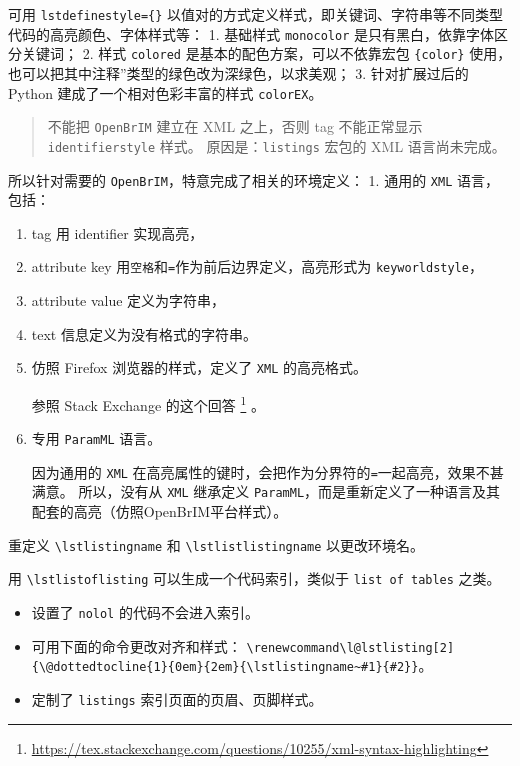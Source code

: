 \documentclass[../Main/thesis.tex]{subfiles}
\begin{document}
可用 \texttt{lstdefinestyle=\{\}}
以值对的方式定义样式，即关键词、字符串等不同类型代码的高亮颜色、字体样式等：
1. 基础样式 \texttt{monocolor} 是只有黑白，依靠字体区分关键词； 2. 样式
\texttt{colored} 是基本的配色方案，可以不依靠宏包 \texttt{\{color\}}
使用，也可以把其中注释''类型的绿色改为深绿色，以求美观； 3.
针对扩展过后的 Python 建成了一个相对色彩丰富的样式 \texttt{colorEX}。

\begin{quote}
不能把 \texttt{OpenBrIM} 建立在 XML 之上，否则 tag 不能正常显示
\texttt{identifierstyle} 样式。 原因是：\texttt{listings} 宏包的 XML
语言尚未完成。
\end{quote}

所以针对需要的 \texttt{OpenBrIM}，特意完成了相关的环境定义： 1. 通用的
\texttt{XML} 语言，包括：

\begin{enumerate}
\item
  tag 用 identifier 实现高亮，
\item
  attribute key 用\texttt{空格}和\texttt{=}作为前后边界定义，高亮形式为
  \texttt{keyworldstyle}，
\item
  attribute value 定义为字符串，
\item
  text 信息定义为没有格式的字符串。
\item
  仿照 Firefox 浏览器的样式，定义了 \texttt{XML} 的高亮格式。

  参照 Stack Exchange 的这个回答 \footnote{
    \url{https://tex.stackexchange.com/questions/10255/xml-syntax-highlighting}
  } 。
\item
  专用 \texttt{ParamML} 语言。

  因为通用的 \texttt{XML}
  在高亮属性的键时，会把作为分界符的\texttt{=}一起高亮，效果不甚满意。
  所以，没有从 \texttt{XML} 继承定义
  \texttt{ParamML}，而是重新定义了一种语言及其配套的高亮（仿照OpenBrIM平台样式）。
\end{enumerate}

重定义 \texttt{\textbackslash{}lstlistingname} 和
\texttt{\textbackslash{}lstlistlistingname} 以更改环境名。

用 \texttt{\textbackslash{}lstlistoflisting}
可以生成一个代码索引，类似于 \texttt{list of tables} 之类。
\begin{itemize}[$\bullet$]
  \item 设置了 \texttt{nolol} 的代码不会进入索引。
  \item 可用下面的命令更改对齐和样式：
  \lstinline[language=TongjiLaTeX,
    style=colorEX]|\renewcommand\l@lstlisting[2]{\@dottedtocline{1}{0em}{2em}{\lstlistingname~#1}{#2}}|。
  \item 定制了 \texttt{listings} 索引页面的页眉、页脚样式。
\end{itemize}
\end{document}
